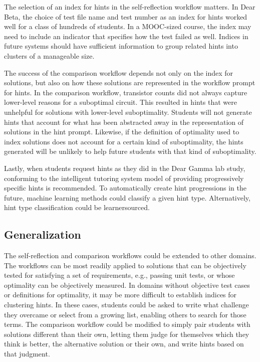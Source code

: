 The selection of an index for hints in the self-reflection workflow matters. In Dear Beta, the choice of test file name and test number as an index for hints worked well for a class of hundreds of students. In a MOOC-sized course, the index may need to include an indicator that specifies how the test failed as well. Indices in future systems should have sufficient information to group related hints into clusters of a manageable size.

The success of the comparison workflow depends not only on the index for solutions, but also on how these solutions are represented in the workflow prompt for hints. In the comparison workflow, transistor counts did not always capture lower-level reasons for a suboptimal circuit. This resulted in hints that were unhelpful for solutions with lower-level suboptimality. Students will not generate hints that account for what has been abstracted away in the representation of solutions in the hint prompt. Likewise, if the definition of optimality used to index solutions does not account for a certain kind of suboptimality, the hints generated will be unlikely to help future students with that kind of suboptimality. 

Lastly, when students request hints as they did in the Dear Gamma lab study, conforming to the intelligent tutoring system model of providing progressively specific hints is recommended. To automatically create hint progressions in the future, machine learning methods could classify a given hint type. Alternatively, hint type classification could be learnersourced. 

\subsection{Generalization}
The self-reflection and comparison workflows could be extended to other domains. The workflows can be most readily applied to solutions that can be objectively tested for satisfying a set of requirements, e.g., passing unit tests, or whose optimality can be objectively measured. In domains without objective test cases or definitions for optimality, it may be more difficult to establish indices for clustering hints. In these cases, students could be asked to write what challenge they overcame or select from a growing list, enabling others to search for those terms. The comparison workflow could be modified to simply pair students with solutions different than their own, letting them judge for themselves which they think is better, the alternative solution or their own, and write hints based on that judgment.

